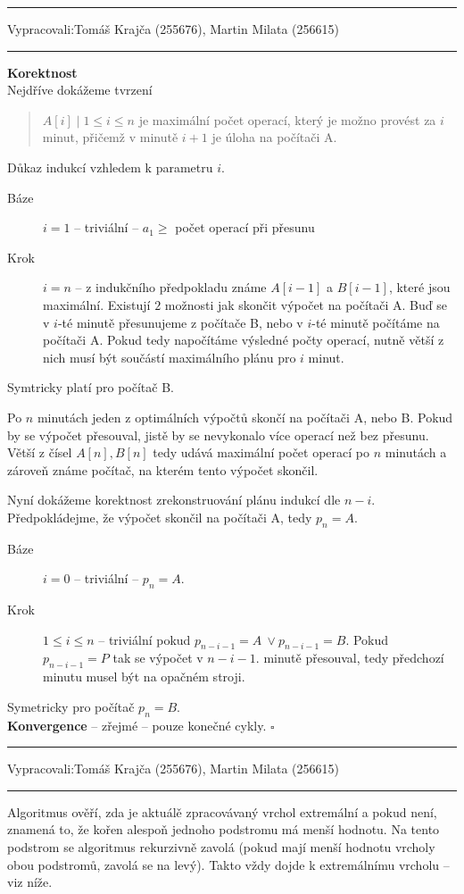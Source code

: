 \documentclass[12pt]{article}
\newcommand{\zadani}[2]{
{\large
\noindent {\bf IB108 \hfill{} Sada #1, Příklad #2 \\[-4mm]}
\noindent\hrule
\vspace{2mm}
\noindent Vypracovali:\hfill{}Tomáš Krajča (255676), Martin Milata (256615)
\vspace{3mm}
\hrule
\bigskip\bigskip}
}
\begin{document}
\clearpage
\zadani{2}{4}
\noindent
\textbf{Korektnost}\\
\renewcommand{\labelenumi}{\textbf{\alph{enumi})}}
Nejdříve dokážeme tvrzení
\begin{quotation}
$A[i] \mid 1\leq i \leq n$ je maximální počet operací, který je
možno provést za $i$ minut, přičemž v minutě $i+1$ je úloha na počítači A.
\end{quotation}
Důkaz indukcí vzhledem k parametru $i$.
\begin{description}
\item [Báze]{$i=1$} -- triviální -- $a_1 \geq $ počet operací při přesunu
\item [Krok]{$i=n$} -- z indukčního předpokladu známe $A[i-1]$ a $B[i-1]$, které
jsou maximální. Existují $2$
možnosti jak skončit výpočet na počítači A. Buď se v $i$-té minutě přesunujeme z
počítače B, nebo v $i$-té minutě počítáme na počítači A. Pokud tedy napočítáme
výsledné počty operací, nutně větší z nich musí být součástí maximálního plánu
pro $i$ minut.
\end{description}
Symtricky platí pro počítač B.

\noindent
Po $n$ minutách jeden z optimálních výpočtů skončí na počítači A, nebo B. Pokud by
se výpočet přesouval, jistě by se nevykonalo více operací než bez přesunu.
Větší z čísel $A[n], B[n]$ tedy udává maximální počet operací po $n$ minutách a
zároveň známe počítač, na kterém tento výpočet skončil. 

\noindent
Nyní dokážeme korektnost zrekonstruování plánu indukcí dle $n-i$.
Předpokládejme, že výpočet skončil na počítači A, tedy $p_n=A$.
\begin{description}
\item [Báze]{$i=0$} -- triviální -- $p_n=A$.
\item [Krok]{$1\leq i \leq n$} -- triviální pokud $p_{n-i-1} = A~\vee p_{n-i-1}
= B$. Pokud $p_{n-i-1} = P$ tak se výpočet v $n-i-1.$ minutě přesouval, tedy
předchozí minutu musel být na opačném stroji.
\end{description}
Symetricky pro počítač $p_n=B$.\\
\textbf{Konvergence} -- zřejmé -- pouze konečné cykly.
\hfill$\square$

\clearpage
\zadani{2}{5}

\noindent
Algoritmus ověří, zda je aktuálě zpracovávaný vrchol extremální a pokud není, znamená to, že kořen
alespoň jednoho podstromu má menší hodnotu. Na tento podstrom se algoritmus rekurzivně zavolá (pokud
mají menší hodnotu vrcholy obou podstromů, zavolá se na levý). Takto vždy dojde k extremálnímu
vrcholu -- viz níže.
\end{document}
